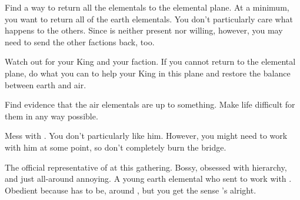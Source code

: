 \documentclass[char]{elementals}
\begin{document}
\begin{itemz}[Goals]
	\item Find a way to return all the elementals to the elemental plane.  At a minimum, you want to return all of the earth elementals.  You don't particularly care what happens to the others.  Since \cEarthKing{} is neither present nor willing, however, you may need to send the other factions back, too.
   \item Watch out for your King and your faction.  If you cannot return to the elemental plane, do what you can to help your King in this plane and restore the balance between earth and air.
	\item Find evidence that the air elementals are up to something.  Make life difficult for them in any way possible.
	\item Mess with \cLoyal{}.  You don't particularly like him.  However, you might need to work with him at some point, so don't completely burn the bridge.
\end{itemz}

\begin{contacts}
	\contact{\cLoyal{}}  The official representative of \cEarthKing{} at this gathering.  Bossy, obsessed with hierarchy, and just all-around annoying.
	\contact{\cMinion{}}  A young earth elemental who \cEarthKing{} sent to work with \cLoyal{}.  Obedient because \cMinion{\they} has to be, around \cLoyal{}, but you get the sense 's  alright.
\end{contacts}
\end{document}
